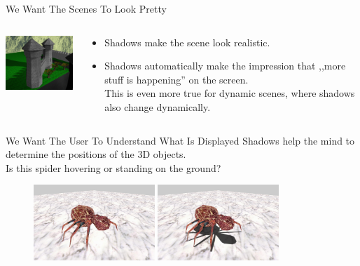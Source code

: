 \documentclass{beamer}
\begin{document}
\begin{frame}{We Want The Scenes To Look Pretty}
  \begin{columns}[T]
    \begin{column}{1in}
      \includegraphics[width=1.5in]{../sunny_street_above_view}
    \end{column}
    \begin{column}{2.5in}
      \begin{itemize}
        \item Shadows make the scene look realistic.
        \item Shadows automatically make the impression that
          ,,more stuff is happening'' on the screen.\\
          This is even more true for dynamic scenes,
          where shadows also change dynamically.
      \end{itemize}
    \end{column}
  \end{columns}

\end{frame}

\begin{frame}{We Want The User To Understand What Is Displayed}
  Shadows help the mind to determine the positions of the 3D objects.\\
  Is this spider hovering or standing on the ground?

  \begin{figure}
    \centering
    \includegraphics[width=1.8in]{spider_shadow_no}
    \hskip10pt
    \includegraphics[width=1.8in]{spider_shadow_yes}
  \end{figure}
\end{frame}
\end{document}
